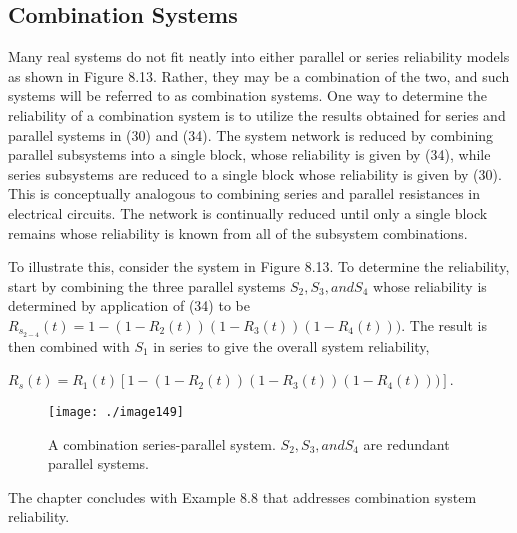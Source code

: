 \subsection{Combination Systems}
\label{subsection:combination-systems}

Many real systems do not fit neatly into either parallel or series
reliability models as shown in Figure 8.13. Rather, they may be a
combination of the two, and such systems will be referred to as
combination systems. One way to determine the reliability of a
combination system is to utilize the results obtained for series and
parallel systems in (30) and (34). The system network is reduced by
combining parallel subsystems into a single block, whose reliability is
given by (34), while series subsystems are reduced to a single block
whose reliability is given by (30). This is conceptually analogous to
combining series and parallel resistances in electrical circuits. The
network is continually reduced until only a single block remains whose
reliability is known from all of the subsystem combinations.

To illustrate this, consider the system in Figure 8.13. To determine the
reliability, start by combining the three parallel systems
$S_2, S_3, and S_4$ whose
reliability is determined by application of (34) to be 
$R_{s_{2-4}}(t) = 1- (1-R_2(t))(1-R_3(t))(1-R_4(t)))$.
The result is then combined with $S_1$ in series to give the
overall system reliability, 

$R_{s}(t) = R_1(t) \left[ 1- (1-R_2(t))(1-R_3(t))(1-R_4(t))) \right]$.


\begin{figure}
\texttt{[image: ./image149]}
\caption{A combination series-parallel system. $S_2, S_3, and S_4$
are redundant parallel systems.}
\label{figure:}
\end{figure}


The chapter concludes with Example 8.8 that addresses combination system
reliability.


